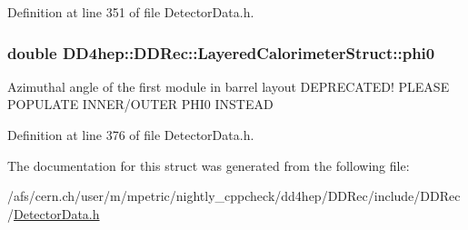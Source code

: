 Definition at line 351 of file DetectorData.h.\hypertarget{struct_d_d4hep_1_1_d_d_rec_1_1_layered_calorimeter_struct_a1c5124161001b81077ce44414cfe046d}{
\subsubsection[{phi0}]{\setlength{\rightskip}{0pt plus 5cm}double {\bf DD4hep::DDRec::LayeredCalorimeterStruct::phi0}}}
\label{struct_d_d4hep_1_1_d_d_rec_1_1_layered_calorimeter_struct_a1c5124161001b81077ce44414cfe046d}
Azimuthal angle of the first module in barrel layout DEPRECATED! PLEASE POPULATE INNER/OUTER PHI0 INSTEAD 

Definition at line 376 of file DetectorData.h.

The documentation for this struct was generated from the following file:\begin{DoxyCompactItemize}
\item 
/afs/cern.ch/user/m/mpetric/nightly\_\-cppcheck/dd4hep/DDRec/include/DDRec/\hyperlink{_detector_data_8h}{DetectorData.h}\end{DoxyCompactItemize}
